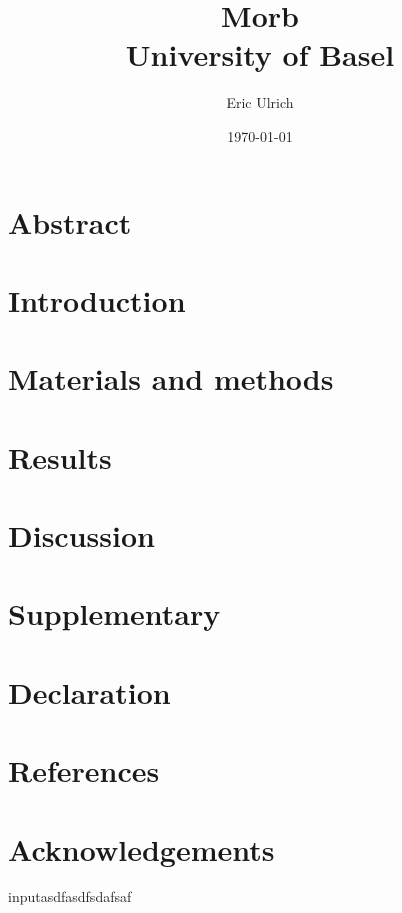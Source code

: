 \documentclass[12pt,twoside]{report}
\title{
    {Morb}\\
    {\large University of Basel}
}
\author{Eric Ulrich}
\date{\today}
\begin{document}
\maketitle


\tableofcontents


\chapter{Abstract}


\chapter{Introduction}



\chapter{Materials and methods}


\chapter{Results}


\chapter{Discussion}

\chapter{Supplementary}

\chapter{Declaration}


\chapter{References}

\printbibliography

\chapter{Acknowledgements}
input{asdfasdfsdafsaf}
\end{document}
